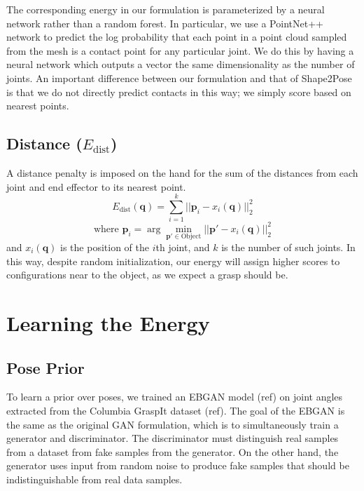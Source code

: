 \documentclass[10pt,twocolumn,letterpaper]{article}
\def\q{\mathbf{q}}
\def\p{\mathbf{p}}
\begin{document}
The corresponding energy in our formulation is parameterized by a neural network rather than a random forest. In particular, we use a PointNet++ network \cite{DBLP:journals/corr/QiYSG17} to predict the log probability that each point in a point cloud sampled from the mesh is a contact point for any particular joint. We do this by having a neural network which outputs a vector the same dimensionality as the number of joints.  An important difference between our formulation and that of Shape2Pose is that we do not directly predict contacts in this way; we simply score based on nearest points.

\subsection{Distance ($E_{\text{dist}}$)}
A distance penalty is imposed on the hand for the sum of the distances from each joint and end effector to its nearest point.
\begin{equation}
E_{\text{dist}}(\q) = \sum_{i=1}^k ||\p_i - x_i(\q)||^2_2
\end{equation}
\begin{equation}
\text{where } \p_i = \arg \min_{\p' \in \text{Object}} ||\p' - x_i(\q)||^2_2
\end{equation}
and $x_i(\q)$ is the position of the $i$th joint, and $k$ is the number of such joints.
In this way, despite random initialization, our energy will assign higher scores to configurations near to the object, as we expect a grasp should be.


\section{Learning the Energy}
\subsection{Pose Prior}
To learn a prior over poses, we trained an EBGAN model (ref) on joint angles extracted from the Columbia GraspIt dataset (ref). The goal of the EBGAN is the same as the original GAN formulation, which is to simultaneously train a generator and discriminator. The discriminator must distinguish real samples from a dataset from fake samples from the generator. On the other hand, the generator uses input from random noise to produce fake samples that should be indistinguishable from real data samples. 
\end{document}

